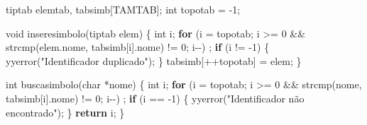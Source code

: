 \documentclass[
  brazilian,
  letterpaper,
]{book}
\newenvironment{Shaded}{\begin{snugshade}}{\end{snugshade}}
\newcommand{\ControlFlowTok}[1]{\textcolor[rgb]{0.00,0.23,0.31}{\textbf{#1}}}
\newcommand{\DataTypeTok}[1]{\textcolor[rgb]{0.68,0.00,0.00}{#1}}
\newcommand{\DecValTok}[1]{\textcolor[rgb]{0.68,0.00,0.00}{#1}}
\newcommand{\NormalTok}[1]{\textcolor[rgb]{0.00,0.23,0.31}{#1}}
\newcommand{\OperatorTok}[1]{\textcolor[rgb]{0.37,0.37,0.37}{#1}}
\newcommand{\StringTok}[1]{\textcolor[rgb]{0.13,0.47,0.30}{#1}}
\theoremstyle{plain}
\theoremstyle{definition}
\theoremstyle{remark}
\begin{document}
\begin{Shaded}
\begin{Highlighting}[]
\NormalTok{tiptab elemtab}\OperatorTok{,}\NormalTok{ tabsimb}\OperatorTok{[}\NormalTok{TAMTAB}\OperatorTok{];}
\DataTypeTok{int}\NormalTok{ topotab }\OperatorTok{=} \OperatorTok{{-}}\DecValTok{1}\OperatorTok{;}

\DataTypeTok{void}\NormalTok{ inseresimbolo}\OperatorTok{(}\NormalTok{tiptab elem}\OperatorTok{)}
\OperatorTok{\{}
    \DataTypeTok{int}\NormalTok{ i}\OperatorTok{;}
    \ControlFlowTok{for} \OperatorTok{(}\NormalTok{i }\OperatorTok{=}\NormalTok{ topotab}\OperatorTok{;}\NormalTok{ i }\OperatorTok{\textgreater{}=} \DecValTok{0} \OperatorTok{\&\&}\NormalTok{ strcmp}\OperatorTok{(}\NormalTok{elem}\OperatorTok{.}\NormalTok{nome}\OperatorTok{,}\NormalTok{ tabsimb}\OperatorTok{[}\NormalTok{i}\OperatorTok{].}\NormalTok{nome}\OperatorTok{)} \OperatorTok{!=} \DecValTok{0}\OperatorTok{;}\NormalTok{ i}\OperatorTok{{-}{-})}
        \OperatorTok{;}
    \ControlFlowTok{if} \OperatorTok{(}\NormalTok{i }\OperatorTok{!=} \OperatorTok{{-}}\DecValTok{1}\OperatorTok{)}
    \OperatorTok{\{}
\NormalTok{        yyerror}\OperatorTok{(}\StringTok{"Identificador duplicado"}\OperatorTok{);}
    \OperatorTok{\}}
\NormalTok{    tabsimb}\OperatorTok{[++}\NormalTok{topotab}\OperatorTok{]} \OperatorTok{=}\NormalTok{ elem}\OperatorTok{;}
\OperatorTok{\}}

\DataTypeTok{int}\NormalTok{ buscasimbolo}\OperatorTok{(}\DataTypeTok{char} \OperatorTok{*}\NormalTok{nome}\OperatorTok{)}
\OperatorTok{\{}
    \DataTypeTok{int}\NormalTok{ i}\OperatorTok{;}
    \ControlFlowTok{for} \OperatorTok{(}\NormalTok{i }\OperatorTok{=}\NormalTok{ topotab}\OperatorTok{;}\NormalTok{ i }\OperatorTok{\textgreater{}=} \DecValTok{0} \OperatorTok{\&\&}\NormalTok{ strcmp}\OperatorTok{(}\NormalTok{nome}\OperatorTok{,}\NormalTok{ tabsimb}\OperatorTok{[}\NormalTok{i}\OperatorTok{].}\NormalTok{nome}\OperatorTok{)} \OperatorTok{!=} \DecValTok{0}\OperatorTok{;}\NormalTok{ i}\OperatorTok{{-}{-})}
        \OperatorTok{;}
    \ControlFlowTok{if} \OperatorTok{(}\NormalTok{i }\OperatorTok{==} \OperatorTok{{-}}\DecValTok{1}\OperatorTok{)}
    \OperatorTok{\{}
\NormalTok{        yyerror}\OperatorTok{(}\StringTok{"Identificador não encontrado"}\OperatorTok{);}
    \OperatorTok{\}}
    \ControlFlowTok{return}\NormalTok{ i}\OperatorTok{;}
\OperatorTok{\}}


\end{Highlighting}
\end{Shaded}
\end{document}
